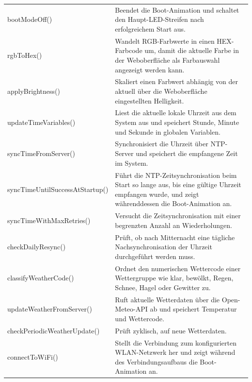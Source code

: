 \begin{longtable}{p{} p{}}
{\small\ttfamily bootModeOff()} &
Beendet die Boot-Animation und schaltet den Haupt-LED-Streifen nach erfolgreichem Start aus. \\

{\small\ttfamily rgbToHex()} &
Wandelt RGB-Farbwerte in einen HEX-Farbcode um, damit die aktuelle Farbe in der Weboberfläche als Farbauswahl angezeigt werden kann. \\

{\small\ttfamily applyBrightness()} &
Skaliert einen Farbwert abhängig von der aktuell über die Weboberfläche eingestellten Helligkeit. \\

{\small\ttfamily updateTimeVariables()} &
Liest die aktuelle lokale Uhrzeit aus dem System aus und speichert Stunde, Minute und Sekunde in globalen Variablen. \\

{\small\ttfamily syncTimeFromServer()} &
Synchronisiert die Uhrzeit über NTP-Server und speichert die empfangene Zeit im System. \\

{\small\ttfamily syncTimeUntilSuccessAtStartup()} &
Führt die NTP-Zeitsynchronisation beim Start so lange aus, bis eine gültige Uhrzeit empfangen wurde, und zeigt währenddessen die Boot-Animation an. \\

{\small\ttfamily syncTimeWithMaxRetries()} &
Versucht die Zeitsynchronisation mit einer begrenzten Anzahl an Wiederholungen. \\

{\small\ttfamily checkDailyResync()} &
Prüft, ob nach Mitternacht eine tägliche Nachsynchronisation der Uhrzeit durchgeführt werden muss. \\

{\small\ttfamily classifyWeatherCode()} &
Ordnet den numerischen Wettercode einer Wettergruppe wie klar, bewölkt, Regen, Schnee, Hagel oder Gewitter zu. \\

{\small\ttfamily updateWeatherFromServer()} &
Ruft aktuelle Wetterdaten über die Open-Meteo-API ab und speichert Temperatur und Wettercode. \\

{\small\ttfamily checkPeriodicWeatherUpdate()} &
Prüft zyklisch, auf neue Wetterdaten. \\

{\small\ttfamily connectToWiFi()} &
Stellt die Verbindung zum konfigurierten WLAN-Netzwerk her und zeigt während des Verbindungsaufbaus die Boot-Animation an. \\


\end{longtable}
